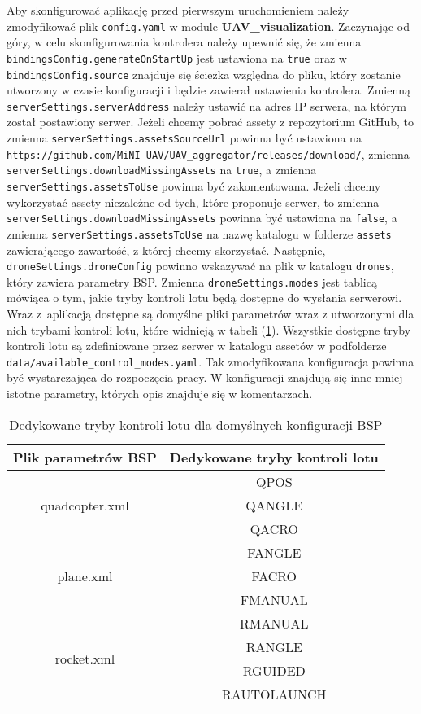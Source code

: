 Aby skonfigurować aplikację przed pierwszym uruchomieniem należy zmodyfikować plik \texttt{config.yaml} w module \textbf{UAV\_visualization}. Zaczynając od góry, w celu skonfigurowania kontrolera należy upewnić się, że zmienna \texttt{bindingsConfig.generateOnStartUp} jest ustawiona na \texttt{true} oraz w \texttt{bindingsConfig.source} znajduje się ścieżka względna do pliku, który zostanie utworzony w czasie konfiguracji i będzie zawierał ustawienia kontrolera. Zmienną \texttt{serverSettings.serverAddress} należy ustawić na adres IP serwera, na którym został postawiony serwer. Jeżeli chcemy pobrać assety z repozytorium GitHub, to zmienna \texttt{serverSettings.assetsSourceUrl} powinna być ustawiona na \texttt{https://github.com/MiNI-UAV/UAV\_aggregator/releases/download/}, zmienna \\ \texttt{serverSettings.downloadMissingAssets} na \texttt{true}, a zmienna \texttt{serverSettings.assetsToUse} powinna być zakomentowana. Jeżeli chcemy wykorzystać assety niezależne od tych, które proponuje serwer, to zmienna \texttt{serverSettings.downloadMissingAssets} powinna być ustawiona na  \texttt{false}, a zmienna \texttt{serverSettings.assetsToUse} na nazwę katalogu w folderze \texttt{assets} zawierającego zawartość, z której chcemy skorzystać. Następnie, \texttt{droneSettings.droneConfig} powinno wskazywać na plik w katalogu \texttt{drones}, który zawiera parametry BSP. Zmienna \texttt{droneSettings.modes} jest tablicą mówiąca o tym, jakie tryby kontroli lotu będą dostępne do wysłania serwerowi. Wraz z~aplikacją dostępne są domyślne pliki parametrów wraz z utworzonymi dla nich trybami kontroli lotu, które widnieją w tabeli (\ref{modesTable}). Wszystkie dostępne tryby kontroli lotu są zdefiniowane przez serwer w katalogu assetów w podfolderze \texttt{data/available\_control\_modes.yaml}. Tak zmodyfikowana konfiguracja powinna być wystarczająca do rozpoczęcia pracy. W konfiguracji znajdują się inne mniej istotne parametry, których opis znajduje się w komentarzach.

\begin{table}[!ht]	
	\begin{center}
		\begin{tabular}{ |c|c| } 
			\hline
			Plik parametrów BSP & Dedykowane tryby kontroli lotu \\
			\hline
			\multirow{3}{8em}{quadcopter.xml} 
			& QPOS \\ & QANGLE \\ & QACRO \\
			\hline
			\multirow{3}{8em}{{plane.xml}} 
			& FANGLE \\ & FACRO \\ & FMANUAL \\
			\hline
			\multirow{4}{8em}{{rocket.xml}} 
			& RMANUAL \\ & RANGLE \\ & RGUIDED \\ & RAUTOLAUNCH \\
			\hline
		\end{tabular}
		\caption{Dedykowane tryby kontroli lotu dla domyślnych konfiguracji BSP}
		\label{modesTable}
	\end{center}
\end{table}

